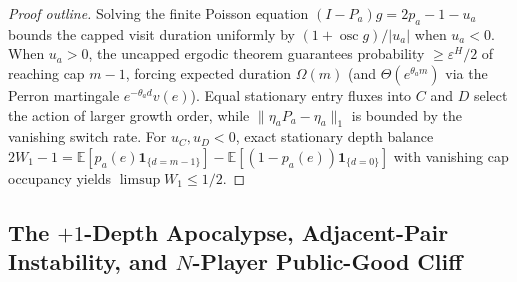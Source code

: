\documentclass[11pt,reqno]{amsart}
\theoremstyle{definition}
\theoremstyle{remark}
\newcommand{\E}{\mathbb{E}}
\newcommand{\one}{\mathbf{1}}
\DeclareMathOperator{\osc}{osc}
\begin{document}
\begin{proof}[Proof outline]
Solving the finite Poisson equation $(I - P_a)g = 2p_a - 1 - u_a$ bounds the capped visit duration uniformly by $(1 + \osc g)/|u_a|$ when $u_a < 0$. When $u_a > 0$, the uncapped ergodic theorem guarantees probability $\ge \varepsilon^H/2$ of reaching cap $m-1$, forcing expected duration $\Omega(m)$ (and $\Theta(e^{\theta_a m})$ via the Perron martingale $e^{-\theta_a d} v(e)$). Equal stationary entry fluxes into $C$ and $D$ select the action of larger growth order, while $\|\eta_a P_a - \eta_a\|_1$ is bounded by the vanishing switch rate. For $u_C, u_D < 0$, exact stationary depth balance $2W_1 - 1 = \E[p_a(e)\one_{\{d=m-1\}}] - \E[(1-p_a(e))\one_{\{d=0\}}]$ with vanishing cap occupancy yields $\limsup W_1 \le 1/2$.
\end{proof}

\subsection{The \texorpdfstring{$+1$}{+1}-Depth Apocalypse, Adjacent-Pair Instability, and \texorpdfstring{$N$}{N}-Player Public-Good Cliff}
\end{document}
